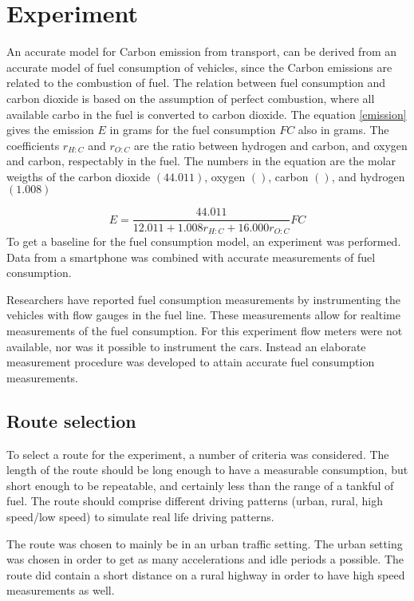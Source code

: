 \section{Experiment}
\label{sec:experiment}
An accurate model for Carbon emission from transport, can be derived from an accurate model of fuel consumption of vehicles, since the Carbon emissions are related to the combustion of fuel. The relation between fuel consumption and carbon dioxide is based on the assumption of perfect combustion, where all available carbo in the fuel is converted to carbon dioxide. The equation \ref{emission} gives the emission $E$ in grams for the fuel consumption $FC$ also in grams. The coefficients $r_{H:C}$ and $r_{O:C}$ are the ratio between hydrogen and carbon, and   oxygen and carbon, respectably in the fuel. The numbers in the equation are the molar weigths of the carbon dioxide $(44.011)$, oxygen $()$, carbon $()$, and hydrogen $(1.008)$

\begin{equation}
     E = \frac{44.011}{12.011+1.008 r_{H:C}+16.000 r_{O:C}} FC
     \label{emission}
\end{equation}
To get a baseline for the fuel consumption model, an experiment was performed. Data from a smartphone was combined with accurate measurements of fuel consumption. 

Researchers have reported fuel consumption measurements by instrumenting the vehicles with flow gauges in the fuel line. These measurements allow for realtime measurements of the fuel consumption. For this experiment flow meters were not available, nor was it possible to instrument the cars. Instead an elaborate measurement procedure was developed to attain accurate fuel consumption measurements.

\subsection{Route selection}
To select a route for the experiment, a number of criteria was considered. The length of the route should be long enough to have a measurable consumption, but short enough to be repeatable, and certainly less than the range of a tankful of fuel. The route should comprise different driving patterns (urban, rural, high speed/low speed) to simulate real life driving patterns. 

The route was chosen to mainly be in an urban traffic setting. The urban setting was chosen in order to get as many accelerations and idle periods a possible. The route did contain a short distance on a rural highway in order to have high speed measurements as well.

